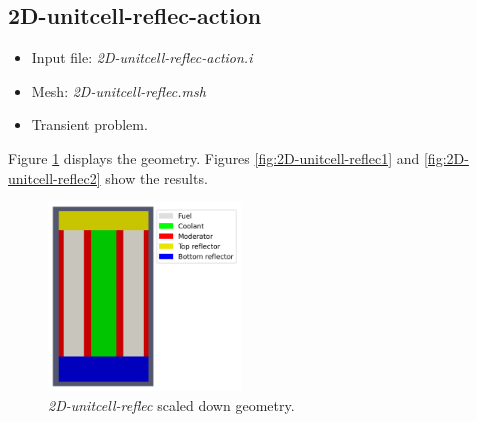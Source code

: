 \documentclass[11pt,letterpaper]{article}
\begin{document}
\subsection{2D-unitcell-reflec-action}

	\begin{itemize}
		\item Input file: \textit{2D-unitcell-reflec-action.i}
		\item Mesh: \textit{2D-unitcell-reflec.msh}
		\item Transient problem.
	\end{itemize}

Figure \ref{fig:2D-unitcell-reflec} displays the geometry.
Figures \ref{fig:2D-unitcell-reflec1} and \ref{fig:2D-unitcell-reflec2} show the results.

	\begin{figure}[htbp!]
		\centering
		\includegraphics[height=5cm]{2D-unitcell-reflec-meshB}
		\caption{\textit{2D-unitcell-reflec} scaled down geometry.}
		\label{fig:2D-unitcell-reflec}
	\end{figure}
\end{document}
